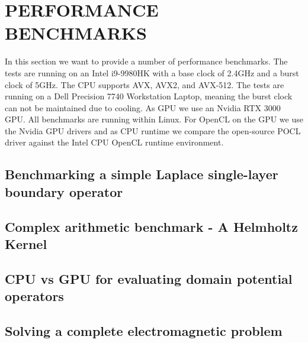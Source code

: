\section{PERFORMANCE BENCHMARKS}

In this section we want to provide a number of performance benchmarks. The tests are running on an Intel i9-9980HK with a base clock of 2.4GHz and a burst clock of 5GHz. The CPU supports AVX, AVX2, and AVX-512.
The tests are running on a Dell Precision 7740 Workstation Laptop, meaning the burst clock can not be maintained due to cooling. As GPU we use an Nvidia RTX 3000 GPU. All benchmarks are running within Linux. For OpenCL on the GPU we use the Nvidia GPU drivers and as CPU runtime we compare the open-source POCL driver against the Intel CPU OpenCL runtime environment.

\subsection{Benchmarking a simple Laplace single-layer boundary operator}

\subsection{Complex arithmetic benchmark - A Helmholtz Kernel}

\subsection{CPU vs GPU for evaluating domain potential operators}


\subsection{Solving a complete electromagnetic problem}


